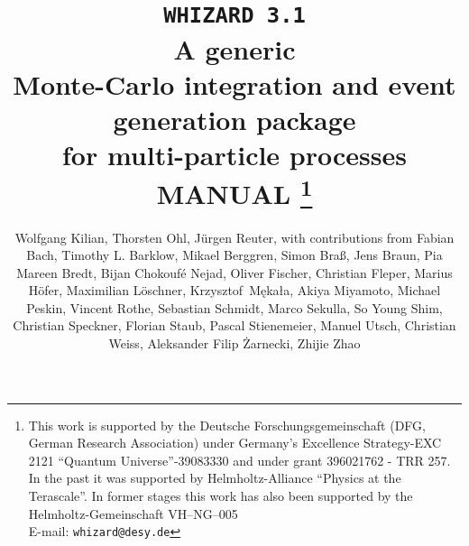 \documentclass[12pt]{book}
\makeatletter
\def\preprintno#1{\def\@preprintno{#1}}
\newcommand{\ttt}[1]{\texttt{#1}}
\makeatother
\begin{document}
\preprintno{}
\title{%
 \ttt{\huge WHIZARD 3.1} \\[\baselineskip]
 A generic \\ Monte-Carlo integration and event generation package \\
 for multi-particle processes\\[\baselineskip]
 MANUAL
 \footnote{%
 This work is supported by the Deutsche Forschungsgemeinschaft (DFG,
 German Research Association) under Germany's Excellence Strategy-EXC
 2121 ``Quantum Universe''-39083330 and under grant 396021762 - TRR 257.
 In the past it was supported by Helmholtz-Alliance ``Physics at the
 Terascale''. In former stages this work has also been supported by
 the Helmholtz-Gemeinschaft VH--NG--005 \\
 E-mail: \ttt{whizard@desy.de}
 }
 \\[\baselineskip]
}
\author{%
  Wolfgang Kilian, %
  Thorsten Ohl, %
  J\"urgen Reuter, %
  with contributions from
  Fabian Bach, %
  Timothy L. Barklow, %
  Mikael Berggren, %
  Simon Bra\ss, %
  Jens Braun, %
  Pia Mareen Bredt, %
  Bijan Chokouf\'{e} Nejad, %
  Oliver Fischer, %
  Christian Fleper, %
  Marius H\"ofer, %
  Maximilian L\"oschner, %
  Krzysztof~M\k{e}ka{\l}a, %
  Akiya Miyamoto, %
  Michael Peskin, %
  Vincent Rothe, %
  Sebastian Schmidt, %
  Marco Sekulla, %
  So Young Shim, %
  Christian Speckner, %
  Florian Staub, %
  Pascal Stienemeier, %
  Manuel Utsch, %
  Christian Weiss, %
  Aleksander Filip \.Zarnecki, %
  Zhijie Zhao}
\end{document}
